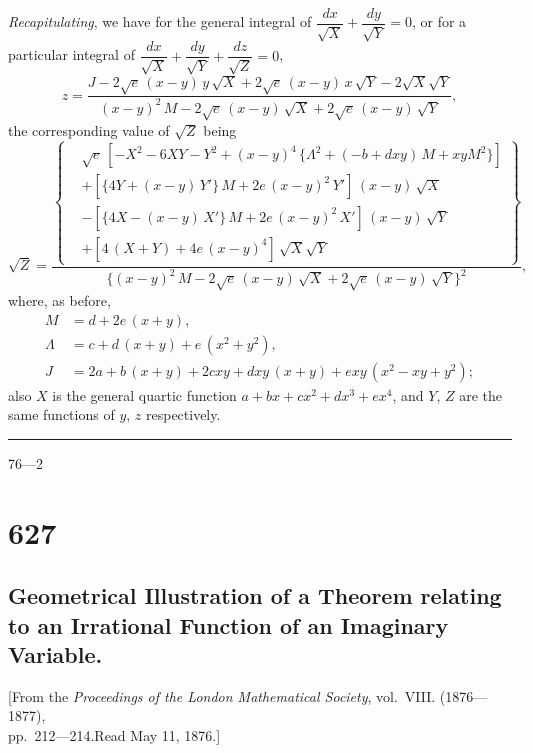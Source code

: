 \documentclass[11pt,a4paper]{book}
\begin{document}
\vspace{2ex}
\textit{Recapitulating}, we have for the general integral of $\dfrac{dx}{\surd X} + \dfrac{dy}{\surd Y} = 0$, or for a particular integral of $\dfrac{dx}{\surd X} + \dfrac{dy}{\surd Y} + \dfrac{dz}{\surd Z} = 0$,
\[
z = \frac{J - 2\surd e\,(x-y)\,y\,\surd X + 2\surd e\,(x-y)\,x\,\surd Y - 2\surd X\surd Y}{(x-y)^2\,M - 2\surd e\,(x-y)\,\surd X + 2\surd e\,(x-y)\,\surd Y},
\]
the corresponding value of $\surd Z$ being
\[
\surd Z = \frac{\left\{\begin{aligned} &\surd e\,[-X^2-6XY-Y^2+(x-y)^4\,\{\Lambda^2+(-b+dxy)\,M+xyM^2\}] \\
&+ [\{4Y+(x-y)\,Y'\}\,M+2e\,(x-y)^2\,Y']\,(x-y)\,\surd X \\
&- [\{4X-(x-y)\,X'\}\,M+2e\,(x-y)^2\,X']\,(x-y)\,\surd Y \\
&+ [4\,(X+Y)+4e\,(x-y)^4]\,\surd X\surd Y \end{aligned}\right\}}{\{(x-y)^2\,M - 2\surd e\,(x-y)\,\surd X + 2\surd e\,(x-y)\,\surd Y\}^2},
\]
where, as before,
\begin{align*}
M &= d + 2e\,(x+y), \\
\Lambda &= c + d\,(x+y) + e\,(x^2+y^2), \\
J &= 2a + b\,(x+y) + 2cxy + dxy\,(x+y) + exy\,(x^2-xy+y^2);
\end{align*}
also $X$ is the general quartic function $a+bx+cx^2+dx^3+ex^4$, and $Y$, $Z$ are the same functions of $y$, $z$ respectively.

\noindent\rule{2em}{0.4pt}\hfill 76---2
\newpage

\section*{627}
\subsection*{Geometrical Illustration of a Theorem relating to an Irrational Function of an Imaginary Variable.}

\begin{center}
\small
[From the \textit{Proceedings of the London Mathematical Society}, vol.~VIII. (1876---1877),\\
pp.~212---214.\quad Read May 11, 1876.]
\end{center}
\end{document}
